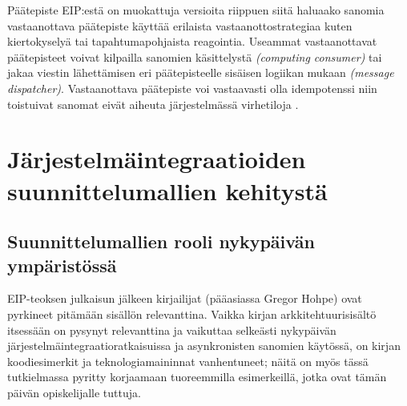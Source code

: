       Päätepiste EIP:estä on muokattuja versioita riippuen siitä haluaako sanomia vastaanottava päätepiste käyttää erilaista vastaanottostrategiaa kuten kiertokyselyä tai tapahtumapohjaista reagointia. Useammat vastaanottavat päätepisteet voivat kilpailla sanomien käsittelystä \textit{(computing consumer)} tai jakaa viestin lähettämisen eri päätepisteelle sisäisen logiikan mukaan \textit{(message dispatcher)}. Vastaanottava päätepiste voi vastaavasti olla idempotenssi niin toistuivat sanomat eivät aiheuta järjestelmässä virhetiloja \citep[sivu~106]{Hohpe2004}.




\chapter{Järjestelmäintegraatioiden suunnittelumallien kehitystä}

\section{Suunnittelumallien rooli nykypäivän ympäristössä}
   EIP-teoksen \citep{Hohpe2004} julkaisun jälkeen kirjailijat (pääasiassa Gregor Hohpe) ovat pyrkineet pitämään sisällön relevanttina. Vaikka kirjan arkkitehtuurisisältö itsessään on pysynyt relevanttina ja vaikuttaa selkeästi nykypäivän järjestelmäintegraatioratkaisuissa ja asynkronisten sanomien käytössä, on kirjan koodiesimerkit ja teknologiamaininnat vanhentuneet; näitä on myös tässä tutkielmassa pyritty korjaamaan tuoreemmilla esimerkeillä, jotka ovat tämän päivän opiskelijalle tuttuja. 


